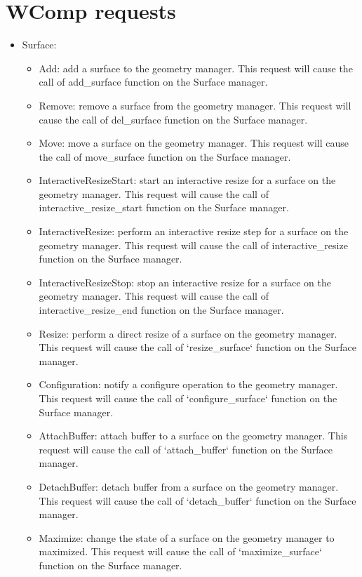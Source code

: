 \section{WComp requests}
\begin{itemize}
	\item Surface: \begin{itemize}
		\item Add: add a surface to the geometry manager. This request will cause the call of add\_surface function on the Surface manager.
		\item Remove: remove a surface from the geometry manager. This request will cause the call of del\_surface function on the Surface manager.
		\item Move: move a surface on the geometry manager. This request will cause the call of move\_surface function on the Surface manager.
		\item InteractiveResizeStart: start an interactive resize for a surface on the geometry manager. This request will cause the call of interactive\_resize\_start function on the Surface manager.
		\item InteractiveResize: perform an interactive resize step for a surface on the geometry manager. This request will cause the call of interactive\_resize function on the Surface manager.
		\item InteractiveResizeStop: stop an interactive resize for a surface on the geometry manager. This request will cause the call of interactive\_resize\_end function on the Surface manager.
		\item Resize: perform a direct resize of a surface on the geometry manager. This request will cause the call of `resize\_surface` function on the Surface manager.
		\item Configuration: notify a configure operation to the geometry manager. This request will cause the call of `configure\_surface` function on the Surface manager.
		\item AttachBuffer: attach buffer to a surface on the geometry manager. This request will cause the call of `attach\_buffer` function on the Surface manager.
		\item DetachBuffer: detach buffer from a surface on the geometry manager. This request will cause the call of `detach\_buffer` function on the Surface manager.
		\item Maximize: change the state of a surface on the geometry manager to maximized. This request will cause the call of `maximize\_surface` function on the Surface manager.

\end{itemize}
\end{itemize}
